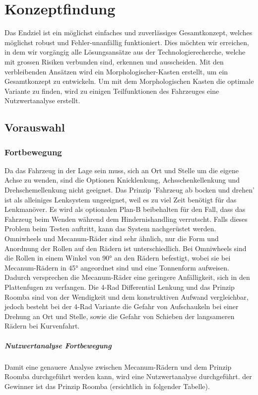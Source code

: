 \newpage
\section{Konzeptfindung}

Das Endziel ist ein möglichst einfaches und zuverlässiges Gesamtkonzept, welches möglichst robust und Fehler-unanfällig funktioniert. Dies möchten wir erreichen, in dem wir vorgängig alle Lösungsansätze aus der Technologierecherche, welche mit grossen Risiken verbunden sind, erkennen und ausscheiden. Mit den verbleibenden Ansätzen wird ein Morphologischer-Kasten erstellt, um ein Gesamtkonzept zu entwickeln. Um mit dem Morphologischen Kasten die optimale Variante zu finden, wird zu einigen Teilfunktionen des Fahrzeuges eine Nutzwertanalyse erstellt.

\subsection{Vorauswahl}
    \subsubsection{Fortbewegung}
        Da das Fahrzeug in der Lage sein muss, sich an Ort und Stelle um die eigene Achse zu wenden, sind die Optionen Knicklenkung, Achsschenkellenkung und Drehschemellenkung nicht geeignet.
        Das Prinzip 'Fahrzeug ab bocken und drehen' ist als alleiniges Lenksystem ungeeignet, weil es zu viel Zeit benötigt für das Lenkmanöver. Es wird als optionalen Plan-B beibehalten für den Fall, dass das Fahrzeug beim Wenden während dem Hindernishandling verrutscht. Falls dieses Problem beim Testen auftritt, kann das System nachgerüstet werden.
        Omniwheels und Mecanum-Räder sind sehr ähnlich, nur die Form und Anordnung der Rollen auf den Rädern ist unterschiedlich. Bei Omniwheels sind die Rollen in einem Winkel von 90° an den Rädern befestigt, wobei sie bei Mecanum-Rädern in 45° angeordnet sind und eine Tonnenform aufweisen. Dadurch versprechen die Mecanum-Räder eine geringere Anfälligkeit, sich in den Plattenfugen zu verfangen. Die 4-Rad Differential Lenkung und das Prinzip Roomba sind von der Wendigkeit und dem konstruktiven Aufwand vergleichbar, jedoch besteht bei der 4-Rad Variante die Gefahr von Aufschaukeln bei einer Drehung an Ort und Stelle, sowie die Gefahr von Schieben der langsameren Rädern bei Kurvenfahrt.

        \subparagraph{Nutzwertanalyse Fortbewegung}
        Damit eine genauere Analyse zwischen Mecanum-Rädern und dem Prinzip Roomba durchgeführt werden kann, wird eine Nutzwertanalyse durchgeführt. der Gewinner ist das Prinzip Roomba (ersichtlich in folgender Tabelle).
        

